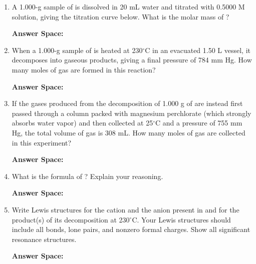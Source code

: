 \documentclass{article}
\begin{document}
\begin{enumerate}[label=\alph*.]
    \item A 1.000-g sample of  is dissolved in 20 mL water and titrated with 0.5000 M  solution, giving the titration curve below. What is the molar mass of ?
    
    \begin{center}
    \end{center}
    
    \textbf{Answer Space:}
    \vspace{4cm}

    \item When a 1.000-g sample of  is heated at 230$^\circ$C in an evacuated 1.50 L vessel, it decomposes into gaseous products, giving a final pressure of 784 mm Hg. How many moles of gas are formed in this reaction?
    
    \textbf{Answer Space:}
    \vspace{4cm}

    \item If the gases produced from the decomposition of 1.000 g of  are instead first passed through a column packed with magnesium perchlorate (which strongly absorbs water vapor) and then collected at 25$^\circ$C and a pressure of 755 mm Hg, the total volume of gas is 308 mL. How many moles of gas are collected in this experiment?
    
    \textbf{Answer Space:}
    \vspace{4cm}

    \item What is the formula of ? Explain your reasoning.
    
    \textbf{Answer Space:}
    \vspace{5cm}

    \item Write Lewis structures for the cation and the anion present in  and for the product(s) of its decomposition at 230$^\circ$C. Your Lewis structures should include all bonds, lone pairs, and nonzero formal charges. Show all significant resonance structures.
    
    \textbf{Answer Space:}
    \vspace{6cm}
\end{enumerate}
\end{document}
